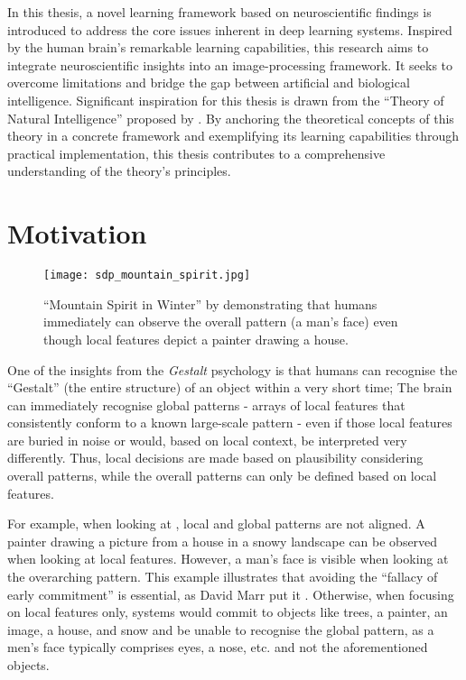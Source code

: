 In this thesis, a novel learning framework based on neuroscientific findings is introduced to address the core issues inherent in deep learning systems. Inspired by the human brain's remarkable learning capabilities, this research aims to integrate neuroscientific insights into an image-processing framework. It seeks to overcome limitations and bridge the gap between artificial and biological intelligence. Significant inspiration for this thesis is drawn from the ``Theory of Natural Intelligence'' proposed by . By anchoring the theoretical concepts of this theory in a concrete framework and exemplifying its learning capabilities through practical implementation, this thesis contributes to a comprehensive understanding of the theory's principles.

\section{Motivation}
\begin{figure}[h]
    \centering
    \texttt{[image: sdp\_mountain\_spirit.jpg]}
    \caption[``Mountain Spirit in Winter'' by Sandro del Prete]{``Mountain Spirit in Winter'' by  demonstrating that humans immediately can observe the overall pattern (a man's face) even though local features depict a painter drawing a house.}
\end{figure}

One of the insights from the \emph{Gestalt} psychology  is that humans can recognise the ``Gestalt'' (the entire structure) of an object within a very short time; The brain can immediately recognise global patterns - arrays of local features that consistently conform to a known large-scale pattern - even if those local features are buried in noise or would, based on local context, be interpreted very differently. Thus, local decisions are made based on plausibility considering overall patterns, while the overall patterns can only be defined based on local features.

For example, when looking at , local and global patterns are not aligned. A painter drawing a picture from a house in a snowy landscape can be observed when looking at local features. However, a man's face is visible when looking at the overarching pattern.
This example illustrates that avoiding the ``fallacy of early commitment'' is essential, as David Marr put it .
Otherwise, when focusing on local features only, systems would commit to objects like trees, a painter, an image, a house, and snow and be unable to recognise the global pattern, as a men's face typically comprises eyes, a nose, etc. and not the aforementioned objects.

